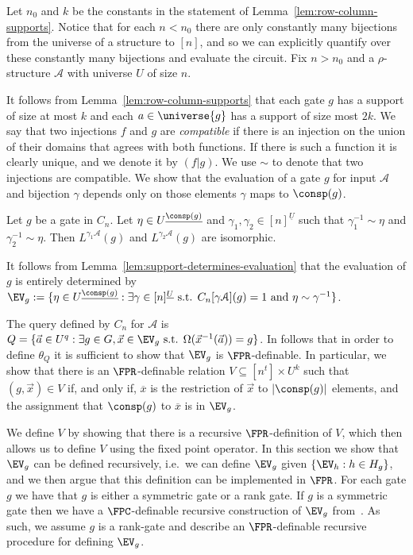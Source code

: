 \documentclass[a4paper,UKenglish]{lipics-v2018}
\begin{document}
Let $n_0$ and $k$ be the constants in the statement of
Lemma~\ref{lem:row-column-supports}. Notice that for each $n < n_0$ there are
only constantly many bijections from the universe of a structure to $[n]$, and
so we can explicitly quantify over these constantly many bijections and evaluate
the circuit. Fix $n > n_0$ and a $\rho$-structure $\mathcal{A}$ with universe
$U$ of size $n$.

It follows from Lemma~\ref{lem:row-column-supports} that each gate $g$ has a
support of size at most $k$ and each $a \in \universe{g}$ has a support of size
most $2k$. We say that two injections $f$ and $g$ are \emph{compatible} if there
is an injection on the union of their domains that agrees with both functions.
If there is such a function it is clearly unique, and we denote it by $(f \vert
g)$. We use $\sim$ to denote that two injections are compatible. We show that
the evaluation of a gate $g$ for input $\mathcal{A}$ and bijection $\gamma$
depends only on those elements $\gamma$ maps to $\consp(g)$.

\begin{lemma}
	Let $g$ be a gate in $C_n$. Let $\eta \in U^{\underline{\consp(g)}}$ and
  $\gamma_1, \gamma_2 \in [n]^{\underline{U}}$ such that $\gamma^{-1}_1 \sim
  \eta$ and $\gamma^{-1}_2 \sim \eta$. Then $L^{\gamma_1 \mathcal{A}}(g)$ and
  $L^{\gamma_2 \mathcal{A}}(g)$ are isomorphic.
	\label{lem:support-determines-evaluation}
\end{lemma}

It follows from Lemma~\ref{lem:support-determines-evaluation} that the
evaluation of $g$ is entirely determined by $\EV_g := \{ \eta \in
U^{\underline{\consp(g)}} : \exists \gamma \in [n]^{\underline{U}}\text{ s.t. }
C_n[\gamma \mathcal{A}](g) = 1 \text{ and } \eta \sim \gamma^{-1}\}$.

The query defined by $C_n$ for $\mathcal{A}$ is $Q = \{ \vec{a} \in U^{q} :
\exists g \in G , \vec{x} \in \EV_g \text{ s.t. } \Omega(\vec{x}^{-1}(\vec{a}))
= g\}$. In follows that in order to define $\theta_Q$ it is sufficient to show
that $\EV_g$ is $\FPR$-definable. In particular, we show that there is an
$\FPR$-definable relation $V \subseteq [n^t] \times U^k$ such that $(g, \vec{x})
\in V$ if, and only if, $\overline{x}$ is the restriction of $\vec{x}$ to $\vert
\consp(g) \vert$ elements, and the assignment that $\consp(g)$ to $\overline{x}$
is in $\EV_g$.

We define $V$ by showing that there is a recursive $\FPR$-definition of $V$,
which then allows us to define $V$ using the fixed point operator. In this
section we show that $\EV_g$ can be defined recursively, i.e.\ we can define
$\EV_g$ given $\{\EV_h : h \in H_g \}$, and we then argue that this definition
can be implemented in $\FPR$. For each gate $g$ we have that $g$ is either a
symmetric gate or a rank gate. If $g$ is a symmetric gate then we have a
$\FPC$-definable recursive construction of $\EV_g$ from~\cite{AndersonD17}. As
such, we assume $g$ is a rank-gate and describe an $\FPR$-definable recursive
procedure for defining $\EV_g$.
\end{document}
